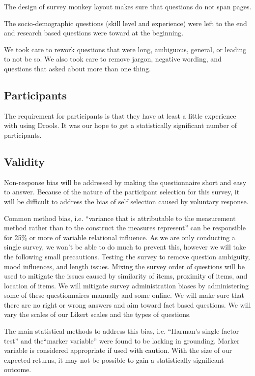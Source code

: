 The design of survey monkey layout makes sure that questions do not span pages.

The socio-demographic questions (skill level and experience) were left to the end and research based questions were toward at the beginning.

We took care to rework questions that were long, ambiguous, general, or leading to not be so.
We also took care to remove jargon, negative wording, and questions that asked about more than one thing.

\subsection{Participants}

The requirement for participants is that they have at least a little experience with using Drools.
It was our hope to get a statistically significant number of participants.

\subsection{Validity}
Non-response bias\cite{armstrong1977estimating} will be addressed by making the questionnaire short and easy to answer.
Because of the nature of the participant selection for this survey, it will be difficult to address the bias of self selection caused by voluntary response.

Common method bias, i.e. ``variance that is attributable to the measurement method rather than to the construct the measures represent''\cite{podsakoff2003common} can be responsible for 25\% or more of variable relational influence.
As we are only conducting a single survey, we won't be able to do much to prevent this, however we will take the following small precautions.
Testing the survey to remove question ambiguity, mood influences, and length issues.
Mixing the survey order of questions will be used to mitigate the issues caused by similarity of items, proximity of items, and location of items.
We will mitigate survey administration biases by administering some of these questionnaires manually and some online.
We will make sure that there are no right or wrong answers and aim toward fact based questions.
We will vary the scales of our Likert scales and the types of questions.

The main statistical methods to address this bias, i.e. ``Harman's single factor test''\cite{podsakoff2003common} and the``marker variable''\cite{lindell2001accounting} were found to be lacking in grounding\cite{gorrell2011countering}.
Marker variable is considered appropriate if used with caution.
With the size of our expected returns, it may not be possible to gain a statistically significant outcome.

